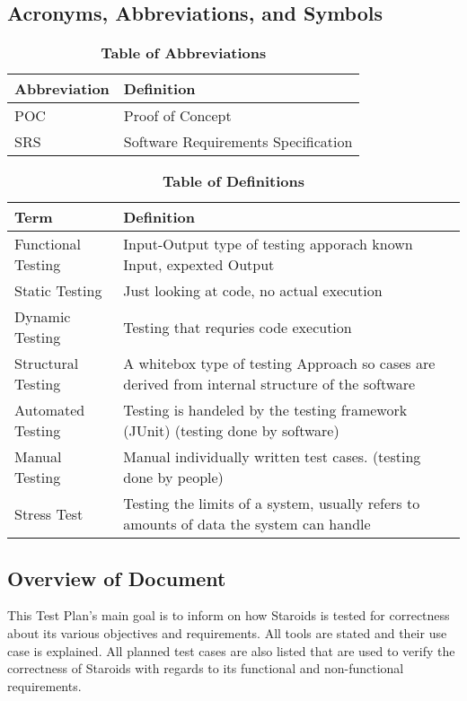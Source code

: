 \documentclass[12pt, titlepage]{article}
\begin{document}
\subsection{Acronyms, Abbreviations, and Symbols}

\begin{table}[hbp]
\caption{\textbf{Table of Abbreviations}} \label{Table}

\begin{tabularx}{\textwidth}{p{3cm}X}
\toprule
\textbf{Abbreviation} & \textbf{Definition} \\
\midrule
POC & Proof of Concept\\
SRS & Software Requirements Specification\\
\bottomrule
\end{tabularx}

\end{table}

\begin{table}[!htbp]
\caption{\textbf{Table of Definitions}} \label{Table}

\begin{tabularx}{\textwidth}{p{3cm}X}
\toprule
\textbf{Term} & \textbf{Definition}\\
\midrule
Functional Testing & Input-Output type of testing apporach known Input, expexted Output\\
Static Testing & Just looking at code, no actual execution\\
Dynamic Testing & Testing that requries code execution\\
Structural Testing & A whitebox type of testing Approach so cases are derived from internal structure of the software\\
Automated Testing & Testing is handeled by the testing framework (JUnit) (testing done by software)\\
Manual Testing & Manual individually written test cases. (testing done by people)\\
Stress Test & Testing the limits of a system, usually refers to amounts of data the system can handle\\
\bottomrule
\end{tabularx}

\end{table}

\subsection{Overview of Document}
This Test Plan's main goal is to inform on how Staroids is tested for correctness about its various objectives and requirements. All tools are stated and their use case is explained. All planned test cases are also listed that are used to verify the correctness of Staroids with regards to its functional and non-functional requirements.
\end{document}
